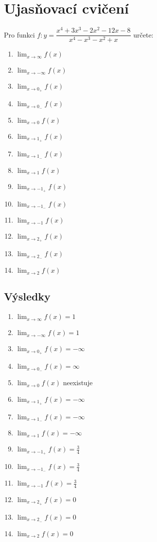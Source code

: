 \documentclass[12pt,a4paper]{article}
\begin{document}
\section*{Ujasňovací cvičení}

Pro funkci $f\colon y = \dfrac{x^4+3 x^3-2 x^2-12 x-8}{x^4-x^3-x^2+x}$ určete:

\begin{enumerate}
	\everymath{\displaystyle}
	\item $\lim_{x \to \infty}f(x)$
	\item $\lim_{x \to -\infty}f(x)$
	\item $\lim_{x \to 0_+}f(x)$
	\item $\lim_{x \to 0_-}f(x)$
	\item $\lim_{x \to 0}f(x)$
	\item $\lim_{x \to 1_+}f(x)$
	\item $\lim_{x \to 1_-}f(x)$
	\item $\lim_{x \to 1}f(x)$
	\item $\lim_{x \to -1_+}f(x)$
	\item $\lim_{x \to -1_-}f(x)$
	\item $\lim_{x \to -1}f(x)$
	\item $\lim_{x \to 2_+}f(x)$
	\item $\lim_{x \to 2_-}f(x)$
	\item $\lim_{x \to 2}f(x)$
\end{enumerate}

\newpage

\subsection*{Výsledky}
\begin{enumerate}
	\everymath{\displaystyle}
	\item $\lim_{x \to \infty}f(x) = 1$
	\item $\lim_{x \to -\infty}f(x) = 1$
	\item $\lim_{x \to 0_+}f(x) = -\infty$
	\item $\lim_{x \to 0_-}f(x) = \infty$
	\item $\lim_{x \to 0}f(x)$ neexistuje
	\item $\lim_{x \to 1_+}f(x) = -\infty$
	\item $\lim_{x \to 1_-}f(x) = -\infty$
	\item $\lim_{x \to 1}f(x) = -\infty$
	\item $\lim_{x \to -1_+}f(x) = \tfrac34$
	\item $\lim_{x \to -1_-}f(x) = \tfrac34$
	\item $\lim_{x \to -1}f(x) = \tfrac34$
	\item $\lim_{x \to 2_+}f(x) = 0$
	\item $\lim_{x \to 2_-}f(x) = 0$
	\item $\lim_{x \to 2}f(x) = 0$
\end{enumerate}
\end{document}
